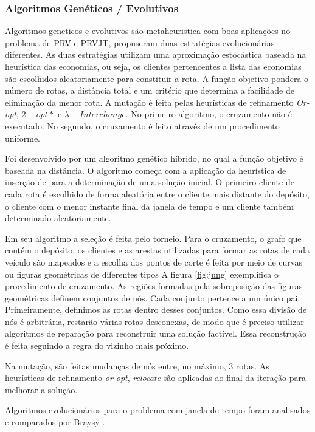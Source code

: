 \subsubsection{Algoritmos Genéticos / Evolutivos}

Algoritmos geneticos e evolutivos são metaheuristica com boas aplicações no problema de PRV e PRVJT, \cite{Homberger}  propuseram duas estratégias evolucionárias diferentes. As duas estratégias utilizam uma aproximação estocástica baseada na heurística das economias, ou seja, os clientes pertencentes a lista das economias são escolhidos aleatoriamente para constituir a rota. A função objetivo pondera o número de rotas, a distância total e um critério que determina a facilidade de eliminação da menor rota. A mutação é feita pelas heurísticas de refinamento \textit{Or-opt}, \({2-opt\ast}\) e \(\lambda-Interchange\). No primeiro algoritmo, o cruzamento não é executado. No segundo, o cruzamento é feito através de um procedimento uniforme.

Foi desenvolvido por \cite{Jung} um algoritmo genético híbrido, no qual a função objetivo é baseada na distância. O algoritmo começa com a aplicação da heurística de inserção de \cite{Solomon} para a determinação de uma solução inicial. O primeiro cliente de cada rota é escolhido de forma aleatória entre o cliente mais distante do depósito, o cliente com o menor instante final da janela de tempo e um cliente também determinado aleatoriamente. 

 Em seu algoritmo a seleção é feita pelo torneio. Para o cruzamento, o grafo que contém o depósito, os clientes e as arestas utilizadas para formar as rotas de cada veículo são mapeados e a escolha dos pontos de corte é feita por meio de curvas ou figuras geométricas de diferentes tipos A figura \ref{fig:jung} exemplifica o procedimento de cruzamento. As regiões formadas pela sobreposição das figuras geométricas definem conjuntos de nós. Cada conjunto pertence a um único pai. Primeiramente, definimos as rotas dentro desses conjuntos. Como essa divisão de nós é arbitrária, restarão várias rotas desconexas, de modo que é preciso utilizar algoritmos de reparação para reconstruir uma solução factível. Essa reconstrução é feita seguindo a regra do vizinho mais próximo.
 
 Na mutação, são feitas mudanças de nós entre, no máximo, 3 rotas. As heurísticas de refinamento \textit{or-opt}, \textit{relocate} são aplicadas ao final da iteração para melhorar a solução.  
 
 Algoritmos evolucionários para o problema com janela de tempo foram analisados e comparados por Braysy \cite{BraysyAG}.
 
